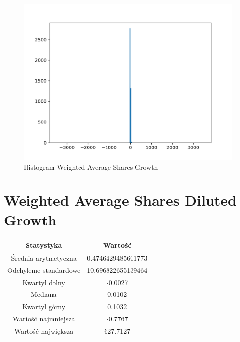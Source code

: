 \documentclass{article}
\begin{document}
\begin{figure}[h!]
    \includegraphics[width=\linewidth]{variables/Weighted Average Shares Growth.png}
    \caption{Histogram Weighted Average Shares Growth }
\end{figure}\section{ Weighted Average Shares Diluted Growth }

\begin{center}
    \begin{tabular}{|c | c|} 
    \hline
    Statystyka & Wartość \\
    \hline\hline
    Średnia arytmetyczna & 0.4746429485601773 \\ 
    \hline
    Odchylenie standardowe & 10.696822655139464 \\
    \hline
    Kwartyl dolny & -0.0027 \\
    \hline
    Mediana & 0.0102 \\
    \hline
    Kwartyl górny & 0.1032 \\
    \hline
    Wartość najmniejsza & -0.7767 \\
    \hline
    Wartość największa & 627.7127 \\
    \hline
   \end{tabular}
\end{center}
\end{document}
